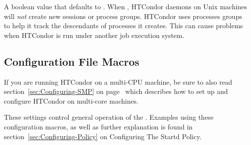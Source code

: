 \begin{description}
\label{param:UseProcessGroups} 
\item[\Macro{USE\_PROCESS\_GROUPS}]
  A boolean value that defaults to .  When ,
  HTCondor daemons on Unix machines will \emph{not} create new sessions
  or process groups. HTCondor uses processes groups to help it track the
  descendants of processes it creates. This can cause problems when
  HTCondor is run under another job execution system.

\end{description}

\subsection{\label{sec:Startd-Config-File-Entries}
Configuration File Macros}

\Note If you are running HTCondor on a multi-CPU machine, be sure
to also read section~\ref{sec:Configuring-SMP} on
page~\pageref{sec:Configuring-SMP} which describes how to set up and
configure HTCondor on multi-core machines.

These settings control general operation of the .
Examples using these configuration macros,
as well as further explanation is found in
section~\ref{sec:Configuring-Policy} on
Configuring The Startd Policy.

